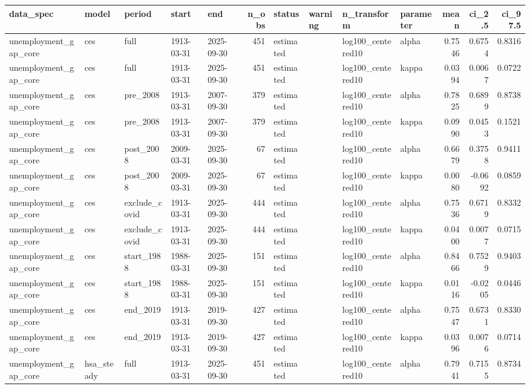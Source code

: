 \begin{tabular}{lllllrllllrrr}
\toprule
data\_spec & model & period & start & end & n\_obs & status & warning & n\_transform & parameter & mean & ci\_2.5 & ci\_97.5 \\
\midrule
unemployment\_gap\_core & ces & full & 1913-03-31 & 2025-09-30 & 451 & estimated &  & log100\_centered10 & alpha & 0.7546 & 0.6754 & 0.8316 \\
unemployment\_gap\_core & ces & full & 1913-03-31 & 2025-09-30 & 451 & estimated &  & log100\_centered10 & kappa & 0.0394 & 0.0067 & 0.0722 \\
unemployment\_gap\_core & ces & pre\_2008 & 1913-03-31 & 2007-09-30 & 379 & estimated &  & log100\_centered10 & alpha & 0.7825 & 0.6899 & 0.8738 \\
unemployment\_gap\_core & ces & pre\_2008 & 1913-03-31 & 2007-09-30 & 379 & estimated &  & log100\_centered10 & kappa & 0.0990 & 0.0453 & 0.1521 \\
unemployment\_gap\_core & ces & post\_2008 & 2009-03-31 & 2025-09-30 & 67 & estimated &  & log100\_centered10 & alpha & 0.6679 & 0.3758 & 0.9411 \\
unemployment\_gap\_core & ces & post\_2008 & 2009-03-31 & 2025-09-30 & 67 & estimated &  & log100\_centered10 & kappa & 0.0080 & -0.0692 & 0.0859 \\
unemployment\_gap\_core & ces & exclude\_covid & 1913-03-31 & 2025-09-30 & 444 & estimated &  & log100\_centered10 & alpha & 0.7536 & 0.6719 & 0.8332 \\
unemployment\_gap\_core & ces & exclude\_covid & 1913-03-31 & 2025-09-30 & 444 & estimated &  & log100\_centered10 & kappa & 0.0400 & 0.0077 & 0.0715 \\
unemployment\_gap\_core & ces & start\_1988 & 1988-03-31 & 2025-09-30 & 151 & estimated &  & log100\_centered10 & alpha & 0.8466 & 0.7529 & 0.9403 \\
unemployment\_gap\_core & ces & start\_1988 & 1988-03-31 & 2025-09-30 & 151 & estimated &  & log100\_centered10 & kappa & 0.0116 & -0.0205 & 0.0446 \\
unemployment\_gap\_core & ces & end\_2019 & 1913-03-31 & 2019-09-30 & 427 & estimated &  & log100\_centered10 & alpha & 0.7547 & 0.6731 & 0.8330 \\
unemployment\_gap\_core & ces & end\_2019 & 1913-03-31 & 2019-09-30 & 427 & estimated &  & log100\_centered10 & kappa & 0.0396 & 0.0076 & 0.0714 \\
unemployment\_gap\_core & hsa\_steady & full & 1913-03-31 & 2025-09-30 & 451 & estimated &  & log100\_centered10 & alpha & 0.7941 & 0.7155 & 0.8734 \\

\end{tabular}
